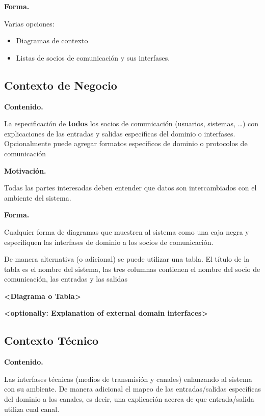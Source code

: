 \documentclass[]{article}
\begin{document}
\textbf{Forma.}

Varias opciones:

\begin{itemize}
\item
  Diagramas de contexto
\item
  Listas de socios de comunicación y sus interfases.
\end{itemize}

\hypertarget{_contexto_de_negocio}{%
\subsection{Contexto de Negocio}\label{_contexto_de_negocio}}

\textbf{Contenido.}

La especificación de \textbf{todos} los socios de comunicación
(usuarios, sistemas, \ldots{}) con explicaciones de las entradas y
salidas específicas del dominio o interfases. Opcionalmente puede
agregar formatos específicos de dominio o protocolos de comunicación

\textbf{Motivación.}

Todas las partes interesadas deben entender que datos son intercambiados
con el ambiente del sistema.

\textbf{Forma.}

Cualquier forma de diagramas que muestren al sistema como una caja negra
y especifiquen las interfases de dominio a los socios de comunicación.

De manera alternativa (o adicional) se puede utilizar una tabla. El
título de la tabla es el nombre del sistema, las tres columnas contienen
el nombre del socio de comunicación, las entradas y las salidas

\textbf{\textless{}Diagrama o Tabla\textgreater{}}

\textbf{\textless{}optionally: Explanation of external domain
interfaces\textgreater{}}

\hypertarget{_contexto_t_cnico}{%
\subsection{Contexto Técnico}\label{_contexto_t_cnico}}

\textbf{Contenido.}

Las interfases técnicas (medios de transmisión y canales) enlanzando al
sistema con su ambiente. De manera adicional el mapeo de las
entradas/salidas específicas del dominio a los canales, es decir, una
explicación acerca de que entrada/salida utiliza cual canal.
\end{document}
